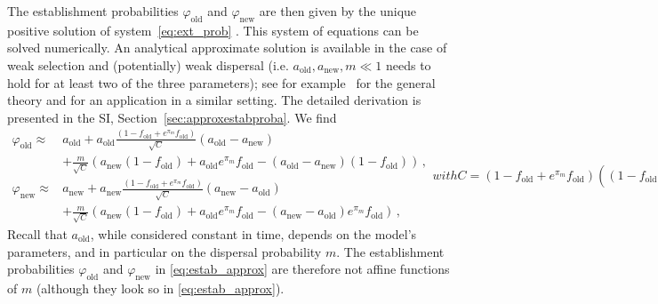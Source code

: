 \documentclass[11pt]{article}
\begin{document}
The establishment probabilities $\varphi_{\text{old}}$ and $\varphi_{\text{new}}$ are then given by the unique positive solution of system~\eqref{eq:ext_prob} \citep[see][Chapters 5.3 and 5.6]{haccou_book}.
This system of equations can be solved numerically. An analytical approximate solution is available in the case of weak selection and (potentially) weak dispersal (i.e. $a_{\text{old}},a_{\text{new}},m\ll 1$ needs to hold for at least two of the three parameters); see for example~\citet[Theorem~5.6]{haccou_book} for the general theory and \citet{tomasini_2018} for an application in a similar setting. The detailed derivation is presented in the SI, Section~\ref{sec:approxestabproba}. We find
\begin{subequations}\label{eq:estab_approx}
	\begin{align}
\varphi_{\text{old}} \approx &%
a_{\text{old}} %
+ a_{\text{old}} \frac{\left(1-f_{\text{old}} + e^{\pi_m} f_{\text{old}}\right)}{\sqrt{C}}(a_{\text{old}}-a_{\text{new}}) \nonumber \\
& + \frac{m}{\sqrt{C}} \left(a_{\text{new}}(1-f_{\text{old}}) + a_{\text{old}} e^{\pi_m} f_{\text{old}} - (a_{\text{old}}-a_{\text{new}})(1-f_{\text{old}})\right) \, ,\\
%
%
\varphi_{\text{new}} \approx & %
a_{\text{new}} %
+ a_{\text{new}} \frac{\left(1-f_{\text{old}}+ e^{\pi_m} f_{\text{old}}\right)}{\sqrt{C}}(a_{\text{new}}-a_{\text{old}}) \nonumber \\
& + \frac{m}{\sqrt{C}}\left( a_{\text{new}}(1-f_{\text{old}}) + a_{\text{old}} e^{\pi_m} f_{\text{old}} - (a_{\text{new}}-a_{\text{old}}) e^{\pi_m} f_{\text{old}} \right)\, ,
	\end{align}
with
\begin{equation}\label{eq:normalization}
C = (1-f_{\text{old}}+ e^{\pi_m} f_{\text{old}}) \left((1-f_{\text{old}})(a_{\text{new}}-a_{\text{old}}+m)^2 + e^{\pi_m} f_{\text{old}} (a_{\text{new}}-a_{\text{old}}-m)^2\right)\, . 
\end{equation}
\end{subequations}
%
Recall that $a_{\text{old}}$, while considered constant in time, depends on the model's parameters, and in particular on the dispersal probability $m$. The establishment probabilities $\varphi_{\text{old}} $ and $\varphi_{\text{new}}$ in \eqref{eq:estab_approx} are therefore not affine functions of $m$ (although they look so in \eqref{eq:estab_approx}). 
\end{document}
